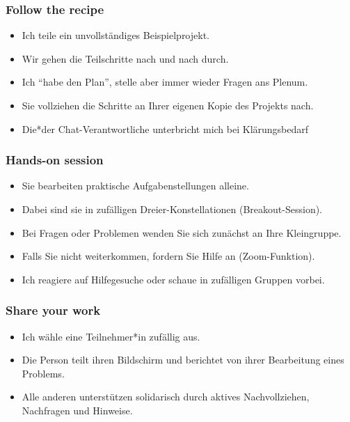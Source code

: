 \documentclass[11pt,german,a4paper]{article}
\providecommand{\tightlist}{%
  \setlength{\itemsep}{0pt}\setlength{\parskip}{0pt}}
\begin{document}
\hypertarget{follow-the-recipe}{%
\subsubsection{Follow the recipe}\label{follow-the-recipe}}

\begin{itemize}
\tightlist
\item
  Ich teile ein unvollständiges Beispielprojekt.
\item
  Wir gehen die Teilschritte nach und nach durch.
\item
  Ich ``habe den Plan'', stelle aber immer wieder Fragen ans Plenum.
\item
  Sie vollziehen die Schritte an Ihrer eigenen Kopie des Projekts nach.
\item
  Die*der Chat-Verantwortliche unterbricht mich bei Klärungsbedarf
\end{itemize}

\hypertarget{hands-on-session}{%
\subsubsection{Hands-on session}\label{hands-on-session}}

\begin{itemize}
\tightlist
\item
  Sie bearbeiten praktische Aufgabenstellungen alleine.
\item
  Dabei sind sie in zufälligen Dreier-Konstellationen (Breakout-Session).
\item
  Bei Fragen oder Problemen wenden Sie sich zunächst an Ihre Kleingruppe.
\item
  Falls Sie nicht weiterkommen, fordern Sie Hilfe an (Zoom-Funktion).
\item
  Ich reagiere auf Hilfegesuche oder schaue in zufälligen Gruppen vorbei.
\end{itemize}

\hypertarget{share-your-work}{%
\subsubsection{Share your work}\label{share-your-work}}

\begin{itemize}
\tightlist
\item
  Ich wähle eine Teilnehmer*in zufällig aus.
\item
  Die Person teilt ihren Bildschirm und berichtet von ihrer Bearbeitung eines Problems.
\item
  Alle anderen unterstützen solidarisch durch aktives Nachvollziehen, Nachfragen und Hinweise.
\end{itemize}
\end{document}
